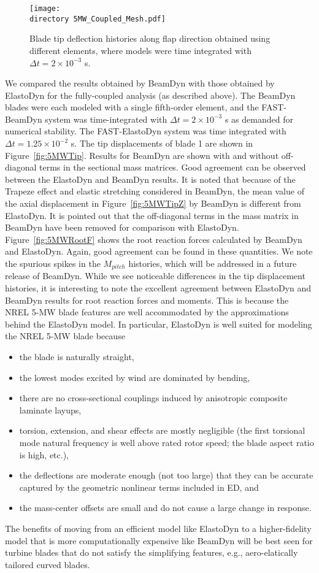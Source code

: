 \documentclass{aiaa-tc}
\def\directory{EPSF/}
\begin{document}
\begin{figure}
    \centering
\texttt{[image: \\directory  5MW\_Coupled\_Mesh.pdf]}
\caption{Blade tip deflection histories along flap direction obtained using different elements, where models were time integrated with $\Delta t = 2 \times 10^{-3}$ s.}
\label{fig:5MW_Coupled_Mesh}
\end{figure} 

We compared the results obtained by BeamDyn with those obtained by ElastoDyn for the fully-coupled analysis (as described above).  The BeamDyn blades were each modeled with a single fifth-order element, and the FAST-BeamDyn system was time-integrated with $\Delta t = 2 \times 10^{-3}$ s as demanded for numerical stability.  
The FAST-ElastoDyn system was time integrated with $\Delta t = 1.25 \times 10^{-2}$ s.
The tip displacements of blade 1 are shown in Figure~\ref{fig:5MWTip}.  Results for BeamDyn are shown with and without off-diagonal terms in the sectional mass matrices.
Good agreement can be observed between the ElastoDyn and BeamDyn results. It is noted that because of the Trapeze effect and elastic stretching considered in BeamDyn, the mean value of the axial displacement in Figure~\ref{fig:5MWTipZ} by BeamDyn is different from ElastoDyn. It is pointed out that the off-diagonal terms in the mass matrix in BeamDyn have been removed for comparison with ElastoDyn. Figure~\ref{fig:5MWRootF} shows the root reaction forces calculated by BeamDyn and ElastoDyn. Again, good agreement can be found in these quantities. We note the spurious spikes in the $M_{pitch}$ histories, which will be addressed in a future release of BeamDyn.  While we see noticeable differences in the tip displacement histories, it is interesting to note the excellent agreement between ElastoDyn and BeamDyn results for root reaction forces and moments.  This is because the NREL 5-MW blade features are well accommodated by the approximations behind the ElastoDyn model.  In particular, 
ElastoDyn is well suited for modeling the NREL 5-MW blade because
\begin{itemize}
\item the blade is naturally straight,
\item the lowest modes excited by wind are dominated by bending,
\item there are no cross-sectional couplings induced by anisotropic composite laminate layups,
\item torsion, extension, and shear effects are mostly negligible (the first torsional mode natural frequency is well above rated rotor speed; the blade aspect ratio is high, etc.),
\item the deflections are moderate enough (not too large) that they can be accurate captured by the geometric nonlinear terms included in ED, and
\item the mass-center offsets are small and do not cause a large change in response.
\end{itemize}
The benefits of moving from an efficient model like ElastoDyn to a higher-fidelity model that is more computationally expensive like BeamDyn will be best seen for turbine blades that do not satisfy the simplifying features, e.g., aero-elatically tailored curved blades.
\end{document}
